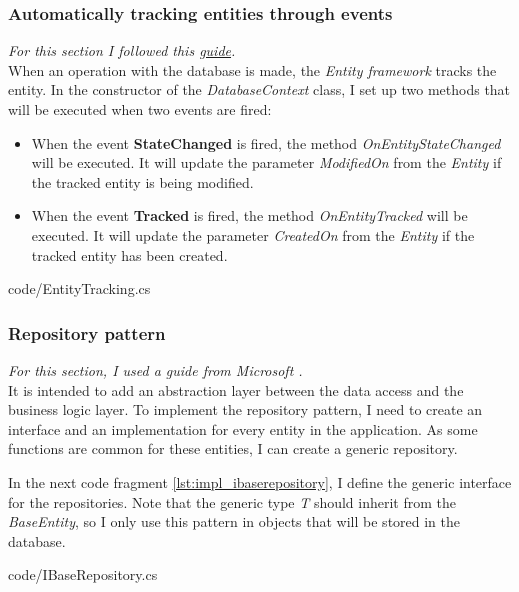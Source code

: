         \subsubsection{Automatically tracking entities through events}
            \textit{For this section I followed this \href{https://docs.microsoft.com/en-us/dotnet/API/microsoft.entityframeworkcore.changetracking.changetracker?view=efcore-5.0}{guide}.}\\
            When an operation with the database is made, the \textit{Entity framework} tracks the entity.  
            In the constructor of the \textit{DatabaseContext} class, I set up two methods that will be executed when two events are fired:
            \begin{itemize}[noitemsep]
                \item When the event \textbf{StateChanged} is fired, the method \textit{OnEntityStateChanged} will be executed. It will update the parameter \textit{ModifiedOn} from the \textit{Entity} if the tracked entity is being modified.
                \item When the event \textbf{Tracked} is fired, the method \textit{OnEntityTracked} will be executed. It will update the parameter \textit{CreatedOn} from the \textit{Entity} if the tracked entity has been created.
            \end{itemize}

            
            {code/EntityTracking.cs}
        
        \subsubsection{Repository pattern}
            \textit{For this section, I used a guide from Microsoft \cite{RepoAndUW}.}\\
            It is intended to add an abstraction layer between the data access and the business logic layer. 
            To implement the repository pattern, I need to create an interface and an implementation for every entity in the application.
            As some functions are common for these entities, I can create a generic repository.

            In the next code fragment \ref{lst:impl_ibaserepository}, I define the generic interface for the repositories. 
            Note that the generic type \textit{T} should inherit from the \textit{BaseEntity}, so I only use this pattern in objects that will
            be stored in the database.
            
            {code/IBaseRepository.cs}

